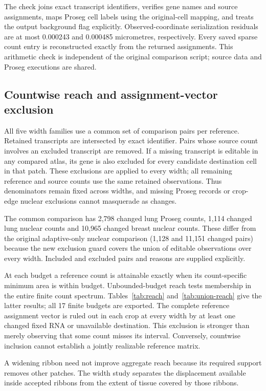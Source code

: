 \documentclass[10pt,letterpaper]{article}
\begin{document}
The check joins exact transcript identifiers, verifies gene names and source assignments, maps Proseg cell labels using the original-cell mapping, and treats the output background flag explicitly. Observed-coordinate serialization residuals are at most 0.000243 and 0.000485 micrometres, respectively. Every saved sparse count entry is reconstructed exactly from the returned assignments. This arithmetic check is independent of the original comparison script; source data and Proseg executions are shared.

\FloatBarrier
\subsection{Countwise reach and assignment-vector exclusion}
All five width families use a common set of comparison pairs per reference. Retained transcripts are intersected by exact identifier. Pairs whose source count involves an excluded transcript are removed. If a missing transcript is editable in any compared atlas, its gene is also excluded for every candidate destination cell in that patch. These exclusions are applied to every width; all remaining reference and source counts use the same retained observations. Thus denominators remain fixed across widths, and missing Proseg records or crop-edge nuclear exclusions cannot masquerade as changes.

The common comparison has 2,798 changed lung Proseg counts, 1,114 changed lung nuclear counts and 10,965 changed breast nuclear counts. These differ from the original adaptive-only nuclear comparison (1,128 and 11,151 changed pairs) because the new exclusion guard covers the union of editable observations over every width. Included and excluded pairs and reasons are supplied explicitly.

At each budget a reference count is attainable exactly when its count-specific minimum area is within budget. Unbounded-budget reach tests membership in the entire finite count spectrum. Tables~\ref{tab:reach} and~\ref{tab:union-reach} give the latter results; all 17 finite budgets are exported. The complete reference assignment vector is ruled out in each crop at every width by at least one changed fixed RNA or unavailable destination. This exclusion is stronger than merely observing that some count misses its interval. Conversely, countwise inclusion cannot establish a jointly realizable reference matrix.

A widening ribbon need not improve aggregate reach because its required support removes other patches. The width study separates the displacement available inside accepted ribbons from the extent of tissue covered by those ribbons.
\end{document}

